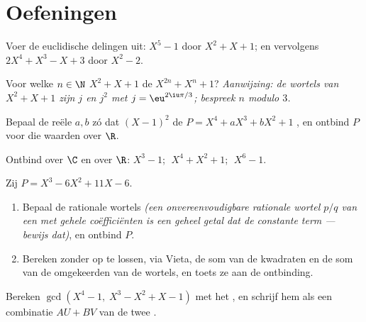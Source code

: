 \section{Oefeningen}

\begin{exercise}[$\star$]\label{exo:b1:poly:1}
Voer de euclidische delingen uit: $X^5 - 1$ door $X^2 + X + 1$; en
vervolgens $2X^4 + X^3 - X + 3$ door $X^2 - 2$.
\end{exercise}

\begin{exercise}[$\star$]\label{exo:b1:poly:2}
Voor welke $n \in \N$  $X^2 + X + 1$ de  $X^{2n} + X^n + 1$?
\emph{Aanwijzing: de wortels van $X^2 + X + 1$ zijn $j$ en $j^2$ met $j =
\eu^{2\iu\pi/3}$; bespreek $n$ modulo $3$.}
\end{exercise}

\begin{exercise}[$\star$]\label{exo:b1:poly:3}
Bepaal de reële $a, b$ zó dat $(X-1)^2$ de  $P = X^4 + aX^3 +
bX^2 + 1$ , en ontbind $P$ voor die waarden over $\R$.
\end{exercise}

\begin{exercise}[$\star$]\label{exo:b1:poly:4}
Ontbind over $\C$ en over $\R$: $X^3 - 1$; $\;X^4 + X^2 + 1$; $\;X^6 -
1$.
\end{exercise}

\begin{exercise}[$\star\star$]\label{exo:b1:poly:5}
Zij $P = X^3 - 6X^2 + 11X - 6$.
\begin{enumerate}
  \item Bepaal de rationale wortels \emph{(een onvereenvoudigbare
        rationale wortel $p/q$ van een  met gehele
        coëfficiënten is een geheel getal dat de constante term 
        --- bewijs dat)}, en ontbind $P$.
  \item Bereken zonder op te lossen, via Vieta, de som van de kwadraten
        en de som van de omgekeerden van de wortels, en toets ze aan de
        ontbinding.
\end{enumerate}
\end{exercise}

\begin{exercise}[$\star\star$]\label{exo:b1:poly:6}
Bereken $\gcd(X^4 - 1,\; X^3 - X^2 + X - 1)$ met het , en schrijf hem als een combinatie $AU + BV$ van de twee
.
\end{exercise}

